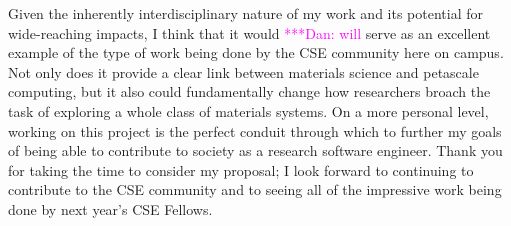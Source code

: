 \documentclass{article}
\newcommand{\katznote}[1]{ {\textcolor{magenta}    { ***Dan:      #1 }}}
\begin{document}
Given the inherently interdisciplinary nature of my work and its potential for wide-reaching impacts, I think that it would \katznote{will} serve as an excellent example of the type of work being done by the CSE community here on campus. Not only does it provide a clear link between materials science and petascale computing, but it also could fundamentally change how researchers broach the task of exploring a whole class of materials systems. On a more personal level, working on this project is the perfect conduit through which to further my goals of being able to contribute to society as a research software engineer. Thank you for taking the time to consider my proposal; I look forward to continuing to contribute to the CSE community and to seeing all of the impressive work being done by next year's CSE Fellows.



\end{document}
